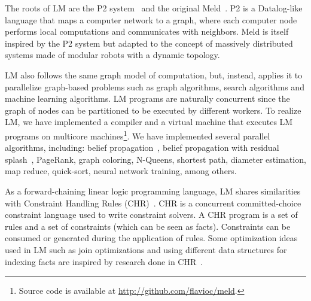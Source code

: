 The roots of LM are the P2 system~\cite{Loo-condie-garofalakis-p2} and the original Meld~\cite{ashley-rollman-derosa-iros07wksp,ashley-rollman-iclp09}.
P2 is a Datalog-like language that maps a computer network
to a graph, where each computer node performs local computations and communicates with neighbors.
Meld is itself inspired by the P2 system but adapted to the concept of massively distributed systems
made of modular robots with a dynamic topology.

LM also follows the same graph model of computation, but, instead, applies it to parallelize graph-based problems such as
graph algorithms, search algorithms and machine learning algorithms. LM programs are naturally concurrent since the graph of nodes
can be partitioned to be executed by different workers.
To realize LM, we have implemented a compiler and a virtual machine that executes LM programs on multicore machines\footnote{Source code is available at \url{http://github.com/flavioc/meld}.}.
We have implemented several parallel algorithms, including: belief propagation~\cite{Gonzalez+al:aistats09paraml},
belief propagation with residual splash~\cite{Gonzalez+al:aistats09paraml}, PageRank, graph coloring,
N-Queens, shortest path, diameter estimation, map reduce, quick-sort, neural network training, among others.

\iffalse
There are also non logical based systems intended to solve graph-based problems such as Dryad, Pregel or GraphLab.
The Dryad system~\cite{Isard:2007:DDD:1272996.1273005} is a framework that combines computational vertices
with communication channels (edges) to form a data-flow graph. 
The Pregel system~\cite{Malewicz:2010:PSL:1807167.1807184} is also graph-based, although programs must be represented
as a sequence of iterations where each iteration is composed of computation and message passing.
Finally, GraphLab~\cite{GraphLab2010} is a library for developing parallel (graph-based) machine learning algorithms in C++
and provides several schedulers to dictate the order of node execution.
\fi

As a forward-chaining linear logic programming language, LM shares similarities with Constraint Handling Rules (CHR)~\cite{Betz:2005kx,DBLP:journals/corr/abs-1006-3039}.
CHR is a concurrent committed-choice constraint language used to write constraint solvers. A CHR program is a set of rules and
a set of constraints (which can be seen as facts). Constraints can be consumed or generated during the application of rules.
Some optimization ideas used in LM such as join optimizations and using different data structures for indexing facts
are inspired by research done in CHR~\cite{DBLP:journals/corr/cs-PL-0408025}.




